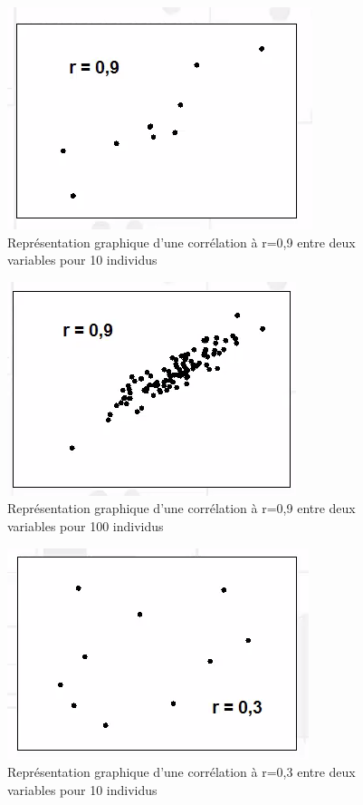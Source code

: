 \begin{figure}[H]\begin{center}\includegraphics[scale=0.4]{ilu/br.png}\caption{Représentation graphique d'une corrélation à r=0,9 entre deux variables pour 10 individus}\end{center}\end{figure}
\begin{figure}[H]\begin{center}\includegraphics[scale=0.4]{ilu/bu.png}\caption{Représentation graphique d'une corrélation à r=0,9 entre deux variables pour 100 individus}\end{center}\end{figure}
\begin{figure}[H]\begin{center}\includegraphics[scale=0.4]{ilu/bs.png}\caption{Représentation graphique d'une corrélation à r=0,3 entre deux variables pour 10 individus}\end{center}\end{figure}
